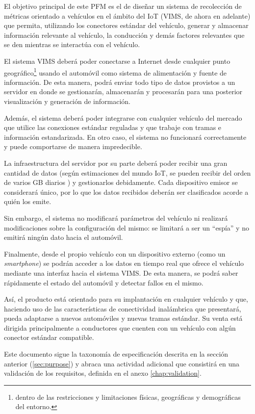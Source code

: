 El objetivo principal de este \ac{PFM} es el de diseñar un sistema de recolección
de métricas orientado a vehículos en el ámbito del \ac{IoT} (\ac{VIMS}, de ahora en adelante)
que permita, utilizando los conectores estándar del vehículo, generar y almacenar
información relevante al vehículo, la conducción y demás factores relevantes que
se den mientras se interactúa con el vehículo.

El sistema \ac{VIMS} deberá poder conectarse a Internet desde cualquier punto
geográfico\footnote{dentro de las restricciones y limitaciones físicas, geográficas y
demográficas del entorno.} usando el automóvil como sistema de alimentación y
fuente de información. De esta manera, podrá enviar todo tipo de datos provistos 
a un servidor en donde se gestionarán, almacenarán y procesarán para 
una posterior visualización y generación de información.

Además, el sistema deberá poder integrarse con cualquier vehículo del mercado que
utilice las conexiones estándar reguladas y que trabaje con tramas e información
estandarizada. En otro caso, el sistema no funcionará correctamente y puede
comportarse de manera impredecible.

La infraestructura del servidor por su parte deberá poder recibir una gran cantidad
de datos (según estimaciones del mundo \ac{IoT}, se pueden recibir del orden de
varios \ac{GB} diarios \cite{vishHowMuchData2020}) y gestionarlos debidamente.
Cada dispositivo emisor se considerará único, por lo que los datos recibidos
deberán ser clasificados acorde a quién los emite.

Sin embargo, el sistema no modificará parámetros del vehículo ni realizará
modificaciones sobre la configuración del mismo: se limitará a ser un ``espía''
y no emitirá ningún dato hacia el automóvil.

Finalmente, desde el propio vehículo con un dispositivo externo (como un
\textit{smartphone}) se podrán acceder a los datos en tiempo real que ofrece el
vehículo mediante una interfaz hacia el sistema \ac{VIMS}. De esta manera, se
podrá saber rápidamente el estado del automóvil y detectar fallos en el mismo.

Así, el producto está orientado para su implantación en cualquier vehículo y que,
haciendo uso de las características de conectividad inalámbrica que presentará, pueda
adaptarse a nuevos automóviles y nuevas tramas estándar. Su venta está dirigida
principalmente a conductores que cuenten con un vehículo con algún conector estándar
compatible.

Este documento sigue la taxonomía de especificación descrita en la sección anterior (\ref{sec:purpose})
y abraca una actividad adicional que consistirá en una validación de los requisitos,
definida en el anexo \ref{chap:validation}.